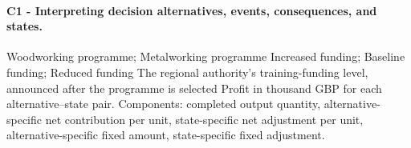 \paragraph*{C1 - Interpreting decision alternatives, events, consequences, and states.}
\label{subsec:problem5-vocational-training-programme-c1}
\DecisionElementsTable
{Woodworking programme; Metalworking programme}
{Increased funding; Baseline funding; Reduced funding}
{The regional authority's training-funding level, announced after the programme is selected}
{Profit in thousand GBP for each alternative--state pair. Components: completed output quantity, alternative-specific net contribution per unit, state-specific net adjustment per unit, alternative-specific fixed amount, state-specific fixed adjustment.}
